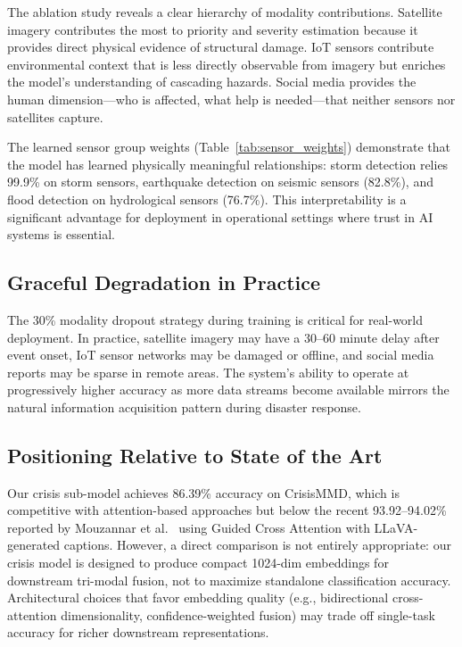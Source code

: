 \documentclass[journal]{IEEEtran}
\begin{document}
The ablation study reveals a clear hierarchy of modality contributions. Satellite imagery contributes the most to priority and severity estimation because it provides direct physical evidence of structural damage. IoT sensors contribute environmental context that is less directly observable from imagery but enriches the model's understanding of cascading hazards. Social media provides the human dimension---who is affected, what help is needed---that neither sensors nor satellites capture.

The learned sensor group weights (Table~\ref{tab:sensor_weights}) demonstrate that the model has learned physically meaningful relationships: storm detection relies 99.9\% on storm sensors, earthquake detection on seismic sensors (82.8\%), and flood detection on hydrological sensors (76.7\%). This interpretability is a significant advantage for deployment in operational settings where trust in AI systems is essential.

\subsection{Graceful Degradation in Practice}

The 30\% modality dropout strategy during training is critical for real-world deployment. In practice, satellite imagery may have a 30--60 minute delay after event onset, IoT sensor networks may be damaged or offline, and social media reports may be sparse in remote areas. The system's ability to operate at progressively higher accuracy as more data streams become available mirrors the natural information acquisition pattern during disaster response.

\subsection{Positioning Relative to State of the Art}

Our crisis sub-model achieves 86.39\% accuracy on CrisisMMD, which is competitive with attention-based approaches but below the recent 93.92--94.02\% reported by Mouzannar et al.~\cite{mouzannar2025guidedcross} using Guided Cross Attention with LLaVA-generated captions. However, a direct comparison is not entirely appropriate: our crisis model is designed to produce compact 1024-dim embeddings for downstream tri-modal fusion, not to maximize standalone classification accuracy. Architectural choices that favor embedding quality (e.g., bidirectional cross-attention dimensionality, confidence-weighted fusion) may trade off single-task accuracy for richer downstream representations.
\end{document}
